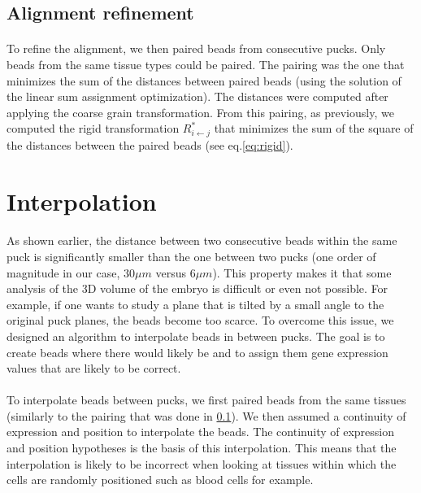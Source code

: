 \documentclass[10pt,a4paper]{article}
\begin{document}
\subsection{Alignment refinement}\label{subsec:ali-ref}
\paragraph{}To refine the alignment, we then paired beads from consecutive pucks.
Only beads from the same tissue types could be paired.
The pairing was the one that minimizes the sum of the distances between paired beads (using the solution of the linear sum assignment optimization).
The distances were computed after applying the coarse grain transformation.
From this pairing, as previously, we computed the rigid transformation \(R^*_{i\leftarrow j}\) that minimizes the sum of the square of the distances between the paired beads (see eq.\eqref{eq:rigid}).
\section{Interpolation}
\paragraph{}As shown earlier, the distance between two consecutive beads within the same puck is significantly smaller than the one between two pucks (one order of magnitude in our case, \(30\mu m\) versus \(6\mu m\)). This property makes it that some analysis of the 3D volume of the embryo is difficult or even not possible. For example, if one wants to study a plane that is tilted by a small angle to the original puck planes, the beads become too scarce. To overcome this issue, we designed an algorithm to interpolate beads in between pucks. The goal is to create beads where there would likely be and to assign them gene expression values that are likely to be correct.
\paragraph{}To interpolate beads between pucks, we first paired beads from the same tissues (similarly to the pairing that was done in \ref{subsec:ali-ref}).
We then assumed a continuity of expression and position to interpolate the beads.
The continuity of expression and position hypotheses is the basis of this interpolation.
This means that the interpolation is likely to be incorrect when looking at tissues within which the cells are randomly positioned such as blood cells for example.
\end{document}
